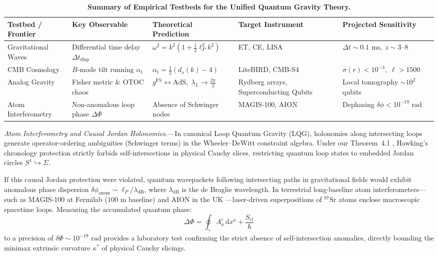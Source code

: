 \documentclass[aps,prl,reprint,twocolumn,superscriptaddress,nofootinbib,floatfix]{revtex4-2}
\newcommand{\dif}{\,\mathrm{d}}
\begin{document}
\begin{table}[t]
\centering
\caption{\textbf{Summary of Empirical Testbeds for the Unified Quantum Gravity Theory.}}
\label{tab:experiments}
\begin{ruledtabular}
\begin{tabular}{p{2.4cm}p{3.0cm}p{3.5cm}p{3.2cm}p{3.3cm}}
\textbf{Testbed / Frontier} & \textbf{Key Observable} & \textbf{Theoretical Prediction} & \textbf{Target Instrument} & \textbf{Projected Sensitivity} \\
\midrule
Gravitational Waves & Differential time delay $\Delta t_{\mathrm{disp}}$ & $\omega^2 = k^2(1 + \frac{1}{2}\ell_P^2 k^2)$ & ET, CE, LISA & $\Delta t \sim 0.1\text{ ms}, \; z \sim 3$--$8$ \\
CMB Cosmology & $B$-mode tilt running $\alpha_t$ & $\alpha_t = \frac{1}{2}(d_s(k) - 4)$ & LiteBIRD, CMB-S4 & $\sigma(r) < 10^{-3}, \; \ell > 1500$ \\
Analog Gravity & Fisher metric \& OTOC chaos & $g^{\mathrm{FS}} \leftrightarrow \mathrm{AdS}, \; \lambda_L \to \frac{2\pi}{\beta}$ & Rydberg arrays, Superconducting Qubits & Local tomography $\sim 10^2$ qubits \\
Atom Interferometry & Non-anomalous loop phase $\Delta \Phi$ & Absence of Schwinger nodes & MAGIS-100, AION & Dephasing $\delta \phi < 10^{-19}\text{ rad}$ \\
\end{tabular}
\end{ruledtabular}
\end{table}

\emph{Atom Interferometry and Causal Jordan Holonomies.}---In canonical Loop Quantum Gravity (LQG), holonomies along intersecting loops generate operator-ordering ambiguities (Schwinger terms) in the Wheeler--DeWitt constraint algebra. Under our Theorem~4.1 \cite{turing2026grand}, Hawking's chronology protection strictly forbids self-intersections in physical Cauchy slices, restricting quantum loop states to embedded Jordan circles $S^1 \hookrightarrow \Sigma$.

If this causal Jordan protection were violated, quantum wavepackets following intersecting paths in gravitational fields would exhibit anomalous phase dispersion $\delta \phi_{\mathrm{anom}} \sim \ell_P / \lambda_{\mathrm{dB}}$, where $\lambda_{\mathrm{dB}}$ is the de Broglie wavelength. In terrestrial long-baseline atom interferometers—such as MAGIS-100 at Fermilab ($100\text{ m}$ baseline) \cite{abe2021matter} and AION in the UK \cite{badurina2020aion}—laser-driven superpositions of $^{87}\mathrm{Sr}$ atoms enclose macroscopic spacetime loops. Measuring the accumulated quantum phase:
\begin{equation}
    \Delta \Phi = \oint_\gamma A_a^i \dif x^a + \frac{S_{\mathrm{cl}}}{\hbar}
\end{equation}
to a precision of $\delta \Phi \sim 10^{-19}\text{ rad}$ provides a laboratory test confirming the strict absence of self-intersection anomalies, directly bounding the minimax extrinsic curvature $\kappa^*$ of physical Cauchy slicings.
\end{document}
